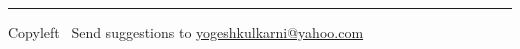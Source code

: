 
\graphicspath{{./images/}}

\makeatletter
\makeatother



	
	\newpage 

\footnotesize

\begin{multicols}{2}
	
\end{multicols}

\rule{\linewidth}{0.25pt}
\scriptsize
Copyleft \textcopyleft\  Send suggestions to 
\href{http://www.yogeshkulkarni.com}{yogeshkulkarni@yahoo.com}


